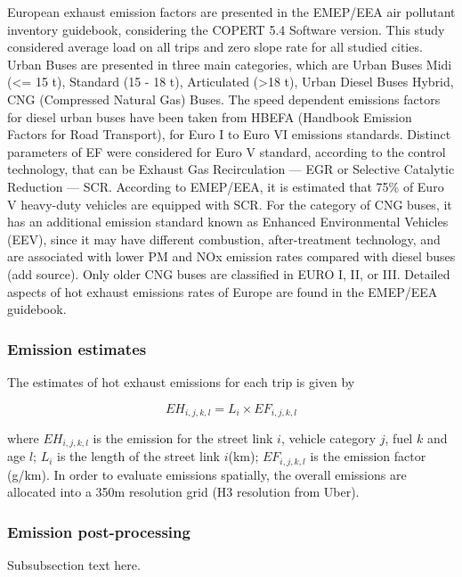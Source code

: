 \documentclass[gc, manuscript]{copernicus}
\begin{document}
European exhaust emission factors are presented in the EMEP/EEA air
pollutant inventory guidebook, considering the COPERT 5.4 Software
version. This study considered average load on all trips and zero slope
rate for all studied cities. Urban Buses are presented in three main
categories, which are Urban Buses Midi (\textless= 15 t), Standard (15 -
18 t), Articulated (\textgreater18 t), Urban Diesel Buses Hybrid, CNG
(Compressed Natural Gas) Buses. The speed dependent emissions factors
for diesel urban buses have been taken from HBEFA (Handbook Emission
Factors for Road Transport), for Euro I to Euro VI emissions standards.
Distinct parameters of EF were considered for Euro V standard, according
to the control technology, that can be Exhaust Gas Recirculation --- EGR
or Selective Catalytic Reduction --- SCR. According to EMEP/EEA, it is
estimated that 75\% of Euro V heavy-duty vehicles are equipped with SCR.
For the category of CNG buses, it has an additional emission standard
known as Enhanced Environmental Vehicles (EEV), since it may have
different combustion, after-treatment technology, and are associated
with lower PM and NOx emission rates compared with diesel buses (add
source). Only older CNG buses are classified in EURO I, II, or III.
Detailed aspects of hot exhaust emissions rates of Europe are found in
the EMEP/EEA guidebook.

\subsubsection{Emission estimates}

The estimates of hot exhaust emissions for each trip is given by

\begin{equation}
EH_{i,j,k,l} = L_i\times EF_{i,j,k,l}
\end{equation}

where \(EH_{i,j,k,l}\) is the emission for the street link \(i\),
vehicle category \(j\), fuel \(k\) and age \(l\); \(L_i\) is the length
of the street link \(i\)(km); \(EF_{i,j,k,l}\) is the emission factor
(g/km). In order to evaluate emissions spatially, the overall emissions
are allocated into a 350m resolution grid (H3 resolution from Uber).

\subsubsection{Emission post-processing}

Subsubsection text here.
\end{document}
